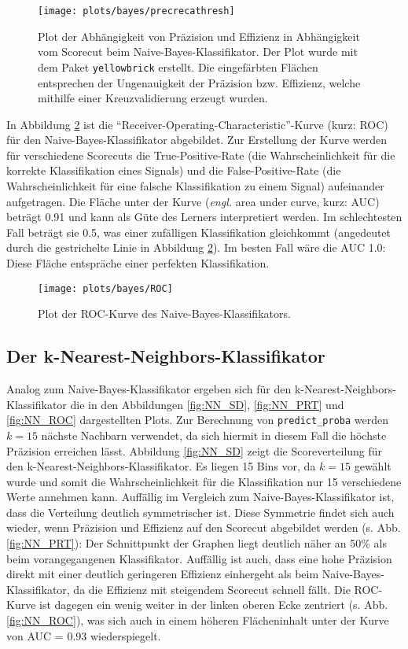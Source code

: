 \begin{figure}
	\centering
	\texttt{[image: plots/bayes/precrecathresh]}
	\caption{Plot der Abhängigkeit von Präzision und Effizienz in Abhängigkeit vom Scorecut beim Naive-Bayes-Klassifikator. Der Plot wurde mit dem Paket \texttt{yellowbrick} \cite{yellowbrick} erstellt. Die eingefärbten Flächen entsprechen der Ungenauigkeit der Präzision bzw. Effizienz, welche mithilfe einer Kreuzvalidierung erzeugt wurden.}
	\label{fig:NB_PRT}
\end{figure}

In Abbildung \ref{fig:NB_ROC} ist die \enquote{Receiver-Operating-Characteristic}-Kurve (kurz: ROC) für den Naive-Bayes-Klassifikator abgebildet. Zur Erstellung der Kurve werden für verschiedene Scorecuts die True-Positive-Rate (die Wahrscheinlichkeit für die korrekte Klassifikation eines Signals) und die False-Positive-Rate (die Wahrscheinlichkeit für eine falsche Klassifikation zu einem Signal) aufeinander aufgetragen. Die Fläche unter der Kurve (\textit{engl.} area under curve, kurz: AUC) beträgt 0.91 und kann als Güte des Lerners interpretiert werden. Im schlechtesten Fall beträgt sie 0.5, was einer zufälligen Klassifikation gleichkommt (angedeutet durch die gestrichelte Linie in Abbildung \ref{fig:NB_ROC}). Im besten Fall wäre die AUC 1.0: Diese Fläche entspräche einer perfekten Klassifikation. 


\begin{figure}
	\centering
	\texttt{[image: plots/bayes/ROC]}
	\caption{Plot der ROC-Kurve des Naive-Bayes-Klassifikators.}
	\label{fig:NB_ROC}
\end{figure}


\subsection{Der k-Nearest-Neighbors-Klassifikator}

Analog zum Naive-Bayes-Klassifikator ergeben sich für den k-Nearest-Neighbors-Klas\-si\-fi\-ka\-tor die in den Abbildungen \ref{fig:NN_SD}, \ref{fig:NN_PRT} und \ref{fig:NN_ROC} dargestellten Plots. Zur Berechnung von \texttt{predict\_proba} werden $k = 15$ nächste Nachbarn verwendet, da sich hiermit in diesem Fall die höchste Präzision erreichen lässt. Abbildung \ref{fig:NN_SD} zeigt die Scoreverteilung für den k-Nearest-Neighbors-Klassifikator. Es liegen 15 Bins vor, da $k = 15$ gewählt wurde und somit die Wahrscheinlichkeit für die Klassifikation nur 15 verschiedene Werte annehmen kann. Auffällig im Vergleich zum Naive-Bayes-Klassifikator ist, dass die Verteilung deutlich symmetrischer ist. Diese Symmetrie findet sich auch wieder, wenn Präzision und Effizienz auf den Scorecut abgebildet werden (s. Abb. \ref{fig:NN_PRT}): Der Schnittpunkt der Graphen liegt deutlich näher an 50\% als beim vorangegangenen Klassifikator. Auffällig ist auch, dass eine hohe Präzision direkt mit einer deutlich geringeren Effizienz einhergeht als beim Naive-Bayes-Klassifikator, da die Effizienz mit steigendem Scorecut schnell fällt. Die ROC-Kurve ist dagegen ein wenig weiter in der linken oberen Ecke zentriert (s. Abb. \ref{fig:NN_ROC}), was sich auch in einem höheren Flächeninhalt unter der Kurve von AUC = 0.93 wiederspiegelt.

